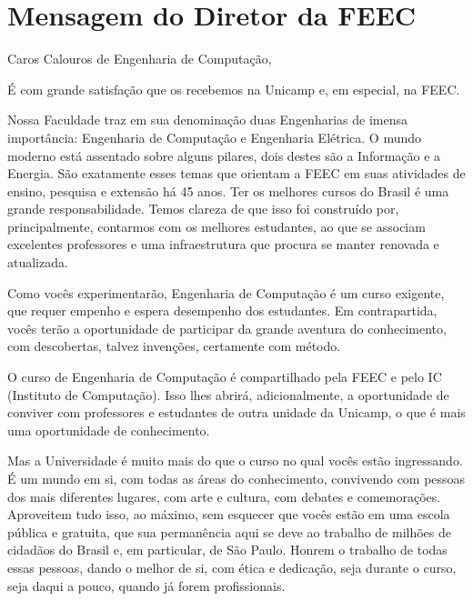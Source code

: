
\section{Mensagem do Diretor da FEEC}

Caros Calouros de Engenharia de Computação,


É com grande satisfação que os recebemos na Unicamp e, em especial, na FEEC.

Nossa Faculdade traz em sua denominação duas Engenharias de imensa importância: Engenharia de Computação e Engenharia Elétrica.  O mundo moderno está assentado sobre alguns pilares, dois destes são a Informação e a Energia.  São exatamente esses temas que orientam a FEEC em suas atividades de ensino, pesquisa e extensão há 45 anos. Ter os melhores cursos do Brasil é uma grande responsabilidade. Temos clareza de que isso foi construído por, principalmente, contarmos com os melhores estudantes, ao que se associam excelentes professores e uma infraestrutura que procura se manter renovada e atualizada.

Como vocês experimentarão, Engenharia de Computação é um curso exigente, que requer empenho e espera desempenho dos estudantes. Em contrapartida, vocês terão a oportunidade de participar da grande aventura do conhecimento, com descobertas, talvez invenções, certamente com método.

O curso de Engenharia de Computação é compartilhado pela FEEC e pelo IC (Instituto de Computação). Isso lhes abrirá, adicionalmente, a oportunidade de conviver com professores e estudantes de outra unidade da Unicamp, o que é mais uma oportunidade de conhecimento.

Mas a Universidade é muito mais do que o curso no qual vocês estão ingressando. É um mundo em si, com todas as áreas do conhecimento, convivendo com pessoas dos mais diferentes lugares, com arte e cultura, com debates e comemorações.  Aproveitem tudo isso, ao máximo, sem esquecer que vocês estão em uma escola pública e gratuita, que sua permanência aqui se deve ao trabalho de milhões de cidadãos do Brasil e, em particular, de São Paulo. Honrem o trabalho de todas essas pessoas, dando o melhor de si, com ética e dedicação, seja durante o curso, seja daqui a pouco, quando já forem profissionais.

